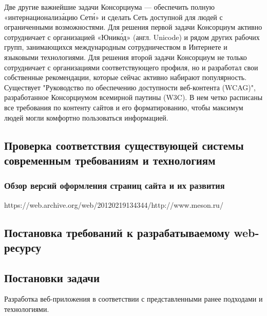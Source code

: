     Две другие важнейшие задачи Консорциума — обеспечить полную «интернационализа́цию Сети́» и сделать Сеть доступной для людей с ограниченными возможностями. Для решения первой задачи Консорциум активно сотрудничает с организацией «Юнико́д» (англ. Unicode) и рядом других рабочих групп, занимающихся международным сотрудничеством в Интернете и языковыми технологиями. Для решения второй задачи Консорциум не только сотрудничает с организациями соответствующего профиля, но и разработал свои собственные рекомендации, которые сейчас активно набирают популярность. Существует "Руководство по обеспечению доступности веб-контента (WCAG)", разработанное Консорциумом всемирной паутины (W3C). В нем четко расписаны все требования по контенту сайтов и его форматированию, чтобы максимум людей могли комфортно пользоваться информацией.
    
\subsection{Проверка соответствия существующей системы современным требованиям и технологиям}
    \subsubsection{Обзор версий оформления страниц сайта и их развития}
        https://web.archive.org/web/20120219134344/http://www.meson.ru/

\subsection{Постановка требований к разрабатываемому web-ресурсу}

\subsection{Постановки задачи}
    Разработка веб-приложения в соответствии с представленными ранее подходами и технологиями.

\clearpage
